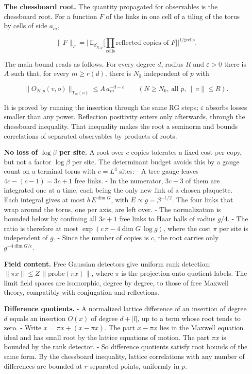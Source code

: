 \documentclass[
  letterpaper,
  11pt]{article}
\begin{document}
\textbf{The chessboard root.} The quantity propagated for observables is
the chessboard root. For a function \(F\) of the links in one cell of a
tiling of the torus by cells of side \(a_m\),

\[\lVert F\rVert_T=\Big|\,\mathbb E_{\beta_{N,p}}\Big[\prod_{\text{cells}}\text{reflected copies of }F\Big]\Big|^{1/\sharp \text{cells}} .\]

The main bound reads as follows. For every degree \(d\), radius \(R\)
and \(\varepsilon>0\) there is \(A\) such that, for every \(m\ge r(d)\),
there is \(N_0\) independent of \(p\) with

\[\lVert O_{N,p}(v,o)\rVert_{T_m(o)}\le A\,a_m^{-d-\varepsilon}\qquad(N\ge N_0,\ \text{all }p,\ \lVert v\rVert\le R).\]

It is proved by running the insertion through the same RG steps;
\(\varepsilon\) absorbs losses smaller than any power. Reflection
positivity enters only afterwards, through the chessboard inequality.
That inequality makes the root a seminorm and bounds correlations of
separated observables by products of roots.

\textbf{No loss of \(\log\beta\) per site.} A root over \(c\) copies
tolerates a fixed cost per copy, but not a factor \(\log\beta\) per
site. The determinant budget avoids this by a gauge count on a terminal
torus with \(c=L^4\) sites: - A tree gauge leaves \(4c-(c-1)=3c+1\) free
links. - In the numerator, \(3c-3\) of them are integrated one at a
time, each being the only new link of a chosen plaquette. Each integral
gives at most \(b\,E^{\dim G}\), with \(E\propto g=\beta^{-1/2}\). The
four links that wrap around the torus, one per axis, are left over. -
The normalization is bounded below by confining all \(3c+1\) free links
to Haar balls of radius \(g/4\). - The ratio is therefore at most
\(\exp(c\,\pi-4\dim G\,\log g)\), where the cost \(\pi\) per site is
independent of \(g\). - Since the number of copies is \(c\), the root
carries only \(g^{-4\dim G/c}\).

\textbf{Field content.} Free Gaussian detectors give uniform rank
detection:
\(\lVert\pi x\rVert\le Z\,\lVert\mathrm{probe}(\pi x)\rVert\), where
\(\pi\) is the projection onto quotient labels. The limit field spaces
are isomorphic, degree by degree, to those of free Maxwell theory,
compatibly with conjugation and reflections.

\textbf{Difference quotients.} - A normalized lattice difference of an
insertion of degree \(d\) equals an insertion \(O(x)\) of degree
\(d+|l|\), up to a term whose root tends to zero. - Write
\(x=\pi x+(x-\pi x)\). The part \(x-\pi x\) lies in the Maxwell equation
ideal and has small root by the lattice equations of motion. The part
\(\pi x\) is bounded by the rank detector. - So difference quotients
satisfy root bounds of the same form. By the chessboard inequality,
lattice correlations with any number of differences are bounded at
\(r\)-separated points, uniformly in \(p\).
\end{document}
